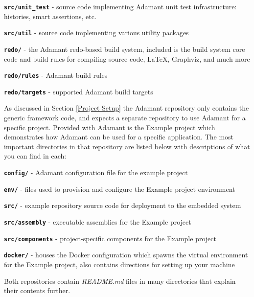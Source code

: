 \begin{spaceditemize}
  \item \textbf{\texttt{src/unit\_test}} - source code implementing Adamant unit test infrastructure: histories, smart assertions, etc.
  \item \textbf{\texttt{src/util}} - source code implementing various utility packages
  \item \textbf{\texttt{redo/}} - the Adamant redo-based build system, included is the build system core code and build rules for compiling source code, \LaTeX, Graphviz, and much more
  \item \textbf{\texttt{redo/rules}} - Adamant build rules
  \item \textbf{\texttt{redo/targets}} - supported Adamant build targets
\end{spaceditemize}
\vspace{5mm} %

As discussed in Section \ref{Project Setup} the Adamant repository only contains the generic framework code, and expects a separate repository to use Adamant for a specific project. Provided with Adamant is the Example project which demonstrates how Adamant can be used for a specific application. The most important directories in that repository are listed below with descriptions of what you can find in each:

\vspace{5mm} %
\begin{spaceditemize}
  \item \textbf{\texttt{config/}} - Adamant configuration file for the example project
  \item \textbf{\texttt{env/}} - files used to provision and configure the Example project environment
  \item \textbf{\texttt{src/}} - example repository source code for deployment to the embedded system
  \item \textbf{\texttt{src/assembly}} - executable assemblies for the Example project
  \item \textbf{\texttt{src/components}} - project-specific components for the Example project
  \item \textbf{\texttt{docker/}} - houses the Docker configuration which spawns the virtual environment for the Example project, also contains directions for setting up your machine
\end{spaceditemize}
\vspace{5mm} %

Both repositories contain \textit{README.md} files in many directories that explain their contents further.

